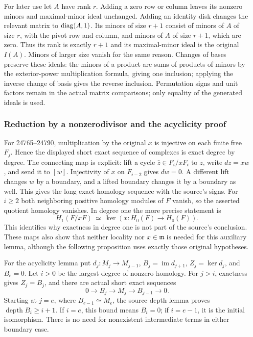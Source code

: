 For later use let \(A\) have rank \(r\). Adding a zero row or column leaves its nonzero minors and maximal-minor ideal unchanged. Adding an identity disk changes the relevant matrix to \({\rm diag}(A,1)\). Its minors of size \(r+1\) consist of minors of \(A\) of size \(r\), with the pivot row and column, and minors of \(A\) of size \(r+1\), which are zero. Thus its rank is exactly \(r+1\) and its maximal-minor ideal is the original \(I(A)\). Minors of larger size vanish for the same reason. Changes of bases preserve these ideals: the minors of a product are sums of products of minors by the exterior-power multiplication formula, giving one inclusion; applying the inverse change of basis gives the reverse inclusion. Permutation signs and unit factors remain in the actual matrix comparisons; only equality of the generated ideals is used.

\subsubsection{Reduction by a nonzerodivisor and the acyclicity proof}\label{reduction-by-a-nonzerodivisor-and-the-acyclicity-proof}

For 24765--24790, multiplication by the original \(x\) is injective on each finite free \(F_j\). Hence the displayed short exact sequence of complexes is exact degree by degree. The connecting map is explicit: lift a cycle \(\bar z\in F_i/xF_i\) to \(z\), write \(dz=xw\), and send it to \([w]\). Injectivity of \(x\) on \(F_{i-2}\) gives \(dw=0\). A different lift changes \(w\) by a boundary, and a lifted boundary changes it by a boundary as well. This gives the long exact homology sequence with the source's signs. For \(i\ge2\) both neighboring positive homology modules of \(F\) vanish, so the asserted quotient homology vanishes. In degree one the more precise statement is \[
 H_1(F/xF)\ \simeq\ \ker(x:H_0(F)\longrightarrow H_0(F)).
\] This identifies why exactness in degree one is not part of the source's conclusion. These maps also show that neither locality nor \(x\in\mathfrak m\) is needed for this auxiliary lemma, although the following proposition uses exactly those original hypotheses.

For the acyclicity lemma put \(d_j:M_j\to M_{j-1}\), \(B_j=\operatorname{im}d_{j+1}\), \(Z_j=\ker d_j\), and \(B_e=0\). Let \(i>0\) be the largest degree of nonzero homology. For \(j>i\), exactness gives \(Z_j=B_j\), and there are actual short exact sequences \[
 0\longrightarrow B_j\longrightarrow M_j\longrightarrow B_{j-1}
 \longrightarrow0 .
\] Starting at \(j=e\), where \(B_{e-1}\simeq M_e\), the source depth lemma proves \(\operatorname{depth}B_i\ge i+1\). If \(i=e\), this bound means \(B_i=0\); if \(i=e-1\), it is the initial isomorphism. There is no need for nonexistent intermediate terms in either boundary case.


